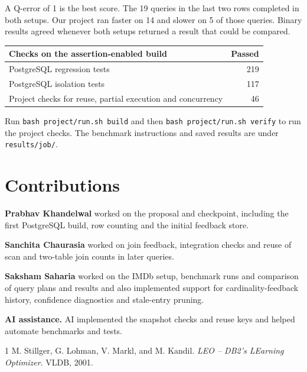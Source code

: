 \documentclass[11pt,a4paper]{article}
\begin{document}
A Q-error of 1 is the best score. The 19 queries in the last two rows
completed in both setups. Our project ran faster on 14 and slower on 5 of
those queries. Binary results agreed whenever both setups returned a result
that could be compared.

\begin{tabularx}{\linewidth}{@{}Xr@{}}
\toprule
\textbf{Checks on the assertion-enabled build} & \textbf{Passed} \\
\midrule
PostgreSQL regression tests & 219 \\
PostgreSQL isolation tests & 117 \\
Project checks for reuse, partial execution and concurrency & 46 \\
\bottomrule
\end{tabularx}

Run \texttt{bash project/run.sh build} and then
\texttt{bash project/run.sh verify} to run the project checks. The benchmark
instructions and saved results are under \texttt{results/job/}.

\section*{Contributions}
\textbf{Prabhav Khandelwal} worked on the proposal and checkpoint, including
the first PostgreSQL build, row counting and the initial feedback store.

\textbf{Sanchita Chaurasia} worked on join feedback, integration checks and
reuse of scan and two-table join counts in later queries.

\textbf{Saksham Saharia} worked on the IMDb setup, benchmark runs and
comparison of query plans and results and also implemented support for
cardinality-feedback history, confidence diagnostics and stale-entry pruning.

\textbf{AI assistance.} AI implemented the snapshot checks and reuse keys
and helped automate benchmarks and tests.

\begin{thebibliography}{1}
 M. Stillger, G. Lohman, V. Markl, and M. Kandil.
\emph{LEO -- DB2's LEarning Optimizer}. VLDB, 2001.
\end{thebibliography}
\end{document}

